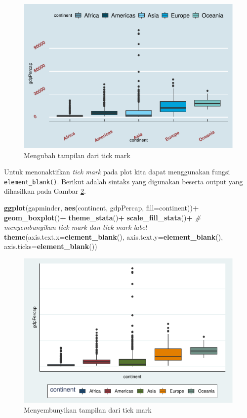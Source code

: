 \documentclass[]{book}
\newenvironment{Shaded}{\begin{snugshade}}{\end{snugshade}}
\newcommand{\KeywordTok}[1]{\textcolor[rgb]{0.13,0.29,0.53}{\textbf{#1}}}
\newcommand{\DataTypeTok}[1]{\textcolor[rgb]{0.13,0.29,0.53}{#1}}
\newcommand{\StringTok}[1]{\textcolor[rgb]{0.31,0.60,0.02}{#1}}
\newcommand{\CommentTok}[1]{\textcolor[rgb]{0.56,0.35,0.01}{\textit{#1}}}
\newcommand{\OperatorTok}[1]{\textcolor[rgb]{0.81,0.36,0.00}{\textbf{#1}}}
\newcommand{\NormalTok}[1]{#1}
\begin{document}
\begin{figure}

{\centering \includegraphics[width=0.7\linewidth]{EnvStat_files/figure-latex/ggtick-1} 

}

\caption{Mengubah tampilan dari tick mark}\label{fig:ggtick}
\end{figure}

Untuk menonaktifkan \emph{tick mark} pada plot kita dapat menggunakan
fungsi \texttt{element\_blank()}. Berikut adalah sintaks yang digunakan
beserta output yang dihasilkan pada Gambar \ref{fig:ggtick2}.

\begin{Shaded}
\begin{Highlighting}[]
\KeywordTok{ggplot}\NormalTok{(gapminder, }\KeywordTok{aes}\NormalTok{(continent, gdpPercap,}
                      \DataTypeTok{fill=}\NormalTok{continent))}\OperatorTok{+}
\StringTok{  }\KeywordTok{geom_boxplot}\NormalTok{()}\OperatorTok{+}
\StringTok{  }\KeywordTok{theme_stata}\NormalTok{()}\OperatorTok{+}
\StringTok{  }\KeywordTok{scale_fill_stata}\NormalTok{()}\OperatorTok{+}
\StringTok{  }\CommentTok{# menyembunyikan tick mark dan tick mark label}
\StringTok{  }\KeywordTok{theme}\NormalTok{(}\DataTypeTok{axis.text.x=}\KeywordTok{element_blank}\NormalTok{(),}
  \DataTypeTok{axis.text.y=}\KeywordTok{element_blank}\NormalTok{(),}
  \DataTypeTok{axis.ticks=}\KeywordTok{element_blank}\NormalTok{())}
\end{Highlighting}
\end{Shaded}

\begin{figure}

{\centering \includegraphics[width=0.7\linewidth]{EnvStat_files/figure-latex/ggtick2-1} 

}

\caption{Menyembunyikan tampilan dari tick mark}\label{fig:ggtick2}
\end{figure}
\end{document}
